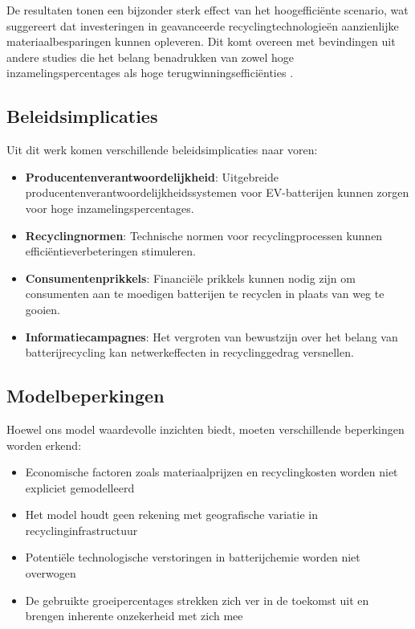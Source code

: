 \documentclass[10pt,a4paper,twocolumn]{article}
\begin{document}
De resultaten tonen een bijzonder sterk effect van het hoogefficiënte scenario, wat suggereert dat investeringen in geavanceerde recyclingtechnologieën aanzienlijke materiaalbesparingen kunnen opleveren. Dit komt overeen met bevindingen uit andere studies die het belang benadrukken van zowel hoge inzamelingspercentages als hoge terugwinningsefficiënties \citep{yang2021}.

\subsection{Beleidsimplicaties}

Uit dit werk komen verschillende beleidsimplicaties naar voren:

\begin{itemize}
    \item \textbf{Producentenverantwoordelijkheid}: Uitgebreide producentenverantwoordelijkheidssystemen voor EV-batterijen kunnen zorgen voor hoge inzamelingspercentages.
    \item \textbf{Recyclingnormen}: Technische normen voor recyclingprocessen kunnen efficiëntieverbeteringen stimuleren.
    \item \textbf{Consumentenprikkels}: Financiële prikkels kunnen nodig zijn om consumenten aan te moedigen batterijen te recyclen in plaats van weg te gooien.
    \item \textbf{Informatiecampagnes}: Het vergroten van bewustzijn over het belang van batterijrecycling kan netwerkeffecten in recyclinggedrag versnellen.
\end{itemize}

\subsection{Modelbeperkingen}

Hoewel ons model waardevolle inzichten biedt, moeten verschillende beperkingen worden erkend:

\begin{itemize}
    \item Economische factoren zoals materiaalprijzen en recyclingkosten worden niet expliciet gemodelleerd
    \item Het model houdt geen rekening met geografische variatie in recyclinginfrastructuur
    \item Potentiële technologische verstoringen in batterijchemie worden niet overwogen
    \item De gebruikte groeipercentages strekken zich ver in de toekomst uit en brengen inherente onzekerheid met zich mee
\end{itemize}
\end{document}
